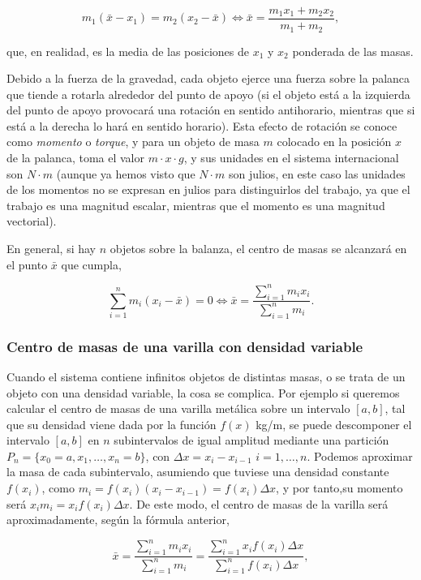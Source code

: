 \documentclass[
  a4paper,
]{scrreport}
\theoremstyle{definition}
\theoremstyle{plain}
\theoremstyle{definition}
\theoremstyle{definition}
\theoremstyle{plain}
\theoremstyle{plain}
\theoremstyle{remark}
\begin{document}
\[
m_1(\bar x-x_1) = m_2(x_2-\bar x) \Leftrightarrow \bar x = \frac{m_1x_1+m_2x_2}{m_1+m_2},
\]

que, en realidad, es la media de las posiciones de \(x_1\) y \(x_2\)
ponderada de las masas.

Debido a la fuerza de la gravedad, cada objeto ejerce una fuerza sobre
la palanca que tiende a rotarla alrededor del punto de apoyo (si el
objeto está a la izquierda del punto de apoyo provocará una rotación en
sentido antihorario, mientras que si está a la derecha lo hará en
sentido horario). Esta efecto de rotación se conoce como \emph{momento}
o \emph{torque}, y para un objeto de masa \(m\) colocado en la posición
\(x\) de la palanca, toma el valor \(m\cdot x\cdot g\), y sus unidades
en el sistema internacional son \(N\cdot m\) (aunque ya hemos visto que
\(N\cdot m\) son julios, en este caso las unidades de los momentos no se
expresan en julios para distinguirlos del trabajo, ya que el trabajo es
una magnitud escalar, mientras que el momento es una magnitud
vectorial).

En general, si hay \(n\) objetos sobre la balanza, el centro de masas se
alcanzará en el punto \(\bar x\) que cumpla,

\[
\sum_{i=1}^n m_i(x_i-\bar x) = 0 \Leftrightarrow \bar x = \frac{\sum_{i=1}^n m_ix_i}{\sum_{i=1}^n m_i}.
\]

\subsubsection{Centro de masas de una varilla con densidad
variable}\label{centro-de-masas-de-una-varilla-con-densidad-variable}

Cuando el sistema contiene infinitos objetos de distintas masas, o se
trata de un objeto con una densidad variable, la cosa se complica. Por
ejemplo si queremos calcular el centro de masas de una varilla metálica
sobre un intervalo \([a,b]\), tal que su densidad viene dada por la
función \(f(x)\) kg/m, se puede descomponer el intervalo \([a,b]\) en
\(n\) subintervalos de igual amplitud mediante una partición
\(P_n=\{x_0=a, x_1, \ldots, x_n=b\}\), con \(\Delta x=x_i-x_{i-1}\)
\(i=1, \ldots, n\). Podemos aproximar la masa de cada subintervalo,
asumiendo que tuviese una densidad constante \(f(x_i)\), como
\(m_i = f(x_i)(x_i-x_{i-1}) = f(x_i) \Delta x\), y por tanto,su momento
será \(x_im_i = x_i f(x_i)\Delta x\). De este modo, el centro de masas
de la varilla será aproximadamente, según la fórmula anterior,

\[
\bar x = \frac{\sum_{i=1}^n m_ix_i}{\sum_{i=1}^n m_i} = \frac{\sum_{i=1}^n x_if(x_i)\Delta x}{\sum_{i=1}^n f(x_i)\Delta x},
\]
\end{document}
